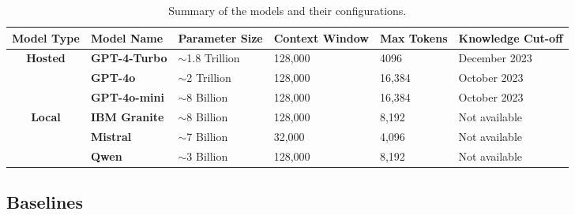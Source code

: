 \begin{table*}[h]
\centering
\caption{Summary of the models and their configurations.}

\begin{adjustbox}{width=0.9\textwidth,center=\textwidth}
\begin{tabular}{|c|l|l|l|l|l|}
\hline
\multicolumn{1}{|l|}{\textbf{Model Type}} & \textbf{Model Name}  & \textbf{Parameter Size} & \textbf{Context Window} & \textbf{Max Tokens} & \textbf{Knowledge Cut-off} \\ \hline
\multirow{3}{*}{\textbf{Hosted}}          & \textbf{GPT-4-Turbo} & $\sim$1.8 Trillion      & 128,000                  & 4096                & December 2023            \\ \cline{2-6} 
         & \textbf{GPT-4o}      & $\sim$2 Trillion        & 128,000                  & 16,384               & October 2023              \\ \cline{2-6} 
           & \textbf{GPT-4o-mini} & $\sim$8 Billion         & 128,000                  & 16,384               & October 2023              \\ \hline
\multirow{3}{*}{\textbf{Local}}           & \textbf{IBM Granite} & $\sim$8 Billion         & 128,000                  & 8,192     & Not available               \\ \cline{2-6} 
             & \textbf{Mistral}     & $\sim$7 Billion         & 32,000                   & 4,096                & Not available                       \\ \cline{2-6} 
       & \textbf{Qwen}        & $\sim$3 Billion         & 128,000                  & 8,192                & Not available                       \\ \hline
\end{tabular}
\end{adjustbox}

\label{tab:models}
\end{table*}

\subsection{Baselines}


